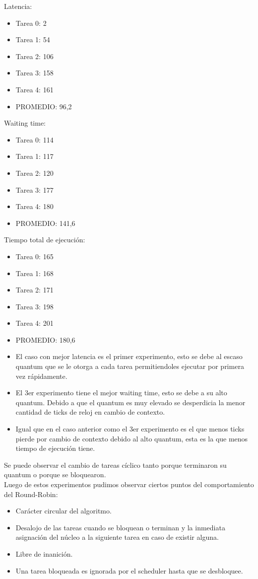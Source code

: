 \indent Latencia:\
\begin{itemize}
 \item Tarea 0: 2
 \item Tarea 1: 54
 \item Tarea 2: 106
 \item Tarea 3: 158
 \item Tarea 4: 161
 \item PROMEDIO: 96,2
\end{itemize}
\indent Waiting time:\
\begin{itemize}
 \item Tarea 0: 114
 \item Tarea 1: 117
 \item Tarea 2: 120
 \item Tarea 3: 177
 \item Tarea 4: 180
 \item PROMEDIO: 141,6
\end{itemize}
\indent Tiempo total de ejecuci\'{o}n:\
\begin{itemize}
 \item Tarea 0: 165
 \item Tarea 1: 168
 \item Tarea 2: 171
 \item Tarea 3: 198
 \item Tarea 4: 201
 \item PROMEDIO: 180,6
\end{itemize}

\indent
\begin{itemize}
 \item El caso con mejor latencia es el primer experimento, esto se debe al escaso quantum que se le otorga a cada tarea
 permitiendoles ejecutar por primera vez r\'{a}pidamente.
 \item El 3er experimento tiene el mejor waiting time, esto se debe a su alto quantum. Debido a que el quantum es muy elevado 
 se desperdicia la menor cantidad de ticks de reloj en cambio de contexto.
 \item Igual que en el caso anterior como el 3er experimento es el que menos ticks pierde por cambio de contexto debido al 
 alto quantum, esta es la que menos tiempo de ejecuci\'{o}n tiene.
\end{itemize}


\indent Se puede observar el cambio de tareas cíclico tanto porque terminaron su quantum o porque se bloquearon.\\


\indent Luego de estos experimentos pudimos observar ciertos puntos del comportamiento del Round-Robin:\\
\begin{itemize}
\item  Carácter circular del algoritmo.
\item  Desalojo de las tareas cuando se bloquean o terminan y la inmediata asignación del núcleo a la siguiente tarea en caso de existir alguna.
\item  Libre de inanición.
\item  Una tarea bloqueada es ignorada por el scheduler hasta que se desbloquee.
\end{itemize}

